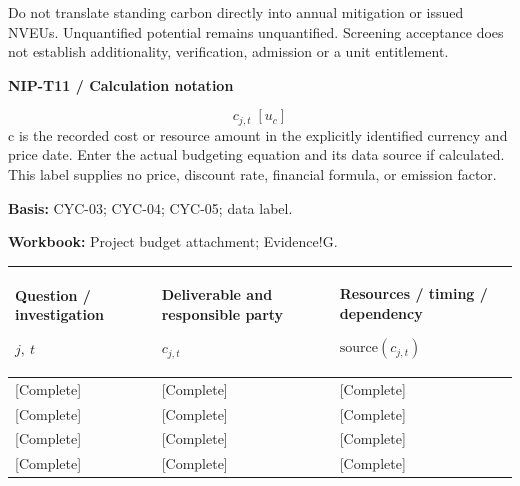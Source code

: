 \begin{Notice}Do not translate standing carbon directly into annual mitigation or issued NVEUs. Unquantified potential remains unquantified. Screening acceptance does not establish additionality, verification, admission or a unit entitlement.\end{Notice}
\par\begingroup\sffamily\fontsize{8}{10}\selectfont\color{NEBGreen}\setlength{\parskip}{2pt}\setlength{\abovedisplayskip}{4pt}\setlength{\belowdisplayskip}{4pt}\setlength{\abovedisplayshortskip}{2pt}\setlength{\belowdisplayshortskip}{3pt}
\textbf{NIP-T11 / Calculation notation}\par
{\fontsize{9}{11}\selectfont\[ c_{j,t}\;[u_c] \]}
c is the recorded cost or resource amount in the explicitly identified currency and price date. Enter the actual budgeting equation and its data source if calculated. This label supplies no price, discount rate, financial formula, or emission factor.\par
\textbf{Basis:} CYC-03; CYC-04; CYC-05; data label.\par
\textbf{Workbook:} Project budget attachment; Evidence!G.\par\endgroup
{\sffamily\fontsize{8.3}{10.3}\selectfont\begin{longtable}{@{}P{57.74mm} P{57.74mm} P{49.49mm}@{}}
\toprule
\textbf{Question / investigation}\par {\normalfont\fontsize{8.2}{10}\selectfont $j,\ t$} & \textbf{Deliverable and responsible party}\par {\normalfont\fontsize{8.2}{10}\selectfont $c_{j,t}$} & \textbf{Resources / timing / dependency}\par {\normalfont\fontsize{8.2}{10}\selectfont $\text{source}(c_{j,t})$}\\\midrule\endhead
\rule{0pt}{7.7mm}[Complete] & [Complete] & [Complete]\\\hline
\rule{0pt}{7.7mm}[Complete] & [Complete] & [Complete]\\\hline
\rule{0pt}{7.7mm}[Complete] & [Complete] & [Complete]\\\hline
\rule{0pt}{7.7mm}[Complete] & [Complete] & [Complete]\\\hline
\end{longtable}}
